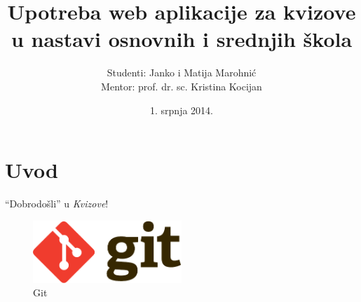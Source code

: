 \documentclass{scrreprt}
\begin{document}
\titlehead{Sveučilište u Zagrebu\\Filozofski fakultet\\Odsijek za informacijske
i komunikacijske znanosti\\Akademska godina 2013/14.}

\title{Upotreba web aplikacije za kvizove u nastavi osnovnih i srednjih škola}

\author{Studenti: Janko i Matija Marohnić\\Mentor: prof. dr. sc. Kristina
Kocijan}

\date{1. srpnja 2014.}

\maketitle
\tableofcontents

\chapter{Uvod}

``Dobrodošli'' u \emph{Kvizove}!

\begin{figure}[b]
  \centering
  \includegraphics[width=0.5\textwidth]{Git-Logo-2Color}
  \caption{Git}
\end{figure}
\end{document}
